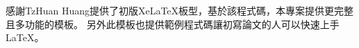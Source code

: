 \begin{acknowledgementszh}
感謝Tz\-Huan Huang提供了初版Xe\LaTeX{}板型，基於該程式碼，本專案提供更完整且多功能的模板。
另外此模板也提供範例程式碼讓初寫論文的人可以快速上手\LaTeX{}。
%
\end{acknowledgementszh}

%
